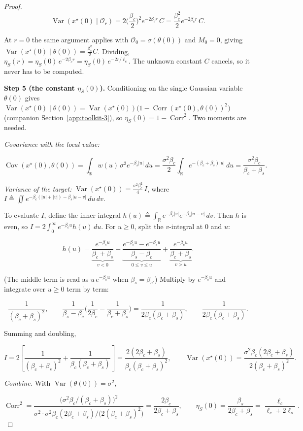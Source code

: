 \begin{proof}
\[
\operatorname{Var}(x^\star(0)\mid\mathcal O_r)=2\Big(\frac{\beta_c}{2}\Big)^2e^{-2\beta_c r}\,C=\frac{\beta_c^2}{2}e^{-2\beta_c r}\,C .
\]

At $r=0$ the same argument applies with $\mathcal O_0=\sigma(\theta(0))$ and $M_0=0$, giving $\operatorname{Var}(x^\star(0)\mid\theta(0))=\tfrac{\beta_c^2}{2}C$. Dividing, $\eta_S(r)=\eta_S(0)\,e^{-2\beta_c r}=\eta_S(0)\,e^{-2r/\ell_c}$. The unknown constant $C$ cancels, so it never has to be computed.

\textbf{Step 5 (the constant $\eta_S(0)$).} Conditioning on the single Gaussian variable $\theta(0)$ gives $\operatorname{Var}(x^\star(0)\mid\theta(0))=\operatorname{Var}(x^\star(0))\big(1-\operatorname{Corr}(x^\star(0),\theta(0))^2\big)$ (companion Section~\ref{app:toolkit-3}), so $\eta_S(0)=1-\operatorname{Corr}^2$. Two moments are needed.

\emph{Covariance with the local value:}

\[
\operatorname{Cov}(x^\star(0),\theta(0))=\int_{\mathbb R}w(u)\,\sigma^2e^{-\beta_s|u|}\,du=\frac{\sigma^2\beta_c}{2}\int_{\mathbb R}e^{-(\beta_c+\beta_s)|u|}\,du=\frac{\sigma^2\beta_c}{\beta_c+\beta_s}.
\]

\emph{Variance of the target:} $\operatorname{Var}(x^\star(0))=\frac{\sigma^2\beta_c^2}{4}\,I$, where $I\triangleq\iint e^{-\beta_c(|u|+|v|)-\beta_s|u-v|}\,du\,dv$.

To evaluate $I$, define the inner integral $h(u)\triangleq\int_{\mathbb R}e^{-\beta_c|v|}e^{-\beta_s|u-v|}\,dv$. Then $h$ is even, so $I=2\int_0^\infty e^{-\beta_c u}h(u)\,du$. For $u\ge0$, split the $v$-integral at $0$ and $u$:

\[
h(u)=\underbrace{\frac{e^{-\beta_s u}}{\beta_c+\beta_s}}_{v<0}+\underbrace{\frac{e^{-\beta_c u}-e^{-\beta_s u}}{\beta_s-\beta_c}}_{0\le v\le u}+\underbrace{\frac{e^{-\beta_c u}}{\beta_c+\beta_s}}_{v>u}.
\]

(The middle term is read as $u\,e^{-\beta_c u}$ when $\beta_s=\beta_c$.) Multiply by $e^{-\beta_c u}$ and integrate over $u\ge0$ term by term:

\[
\frac{1}{(\beta_c+\beta_s)^2},\qquad \frac{1}{\beta_s-\beta_c}\Big(\frac{1}{2\beta_c}-\frac{1}{\beta_c+\beta_s}\Big)=\frac{1}{2\beta_c(\beta_c+\beta_s)},\qquad \frac{1}{2\beta_c(\beta_c+\beta_s)} .
\]

Summing and doubling,

\begin{equation}
I=2\left[\frac{1}{(\beta_c+\beta_s)^2}+\frac{1}{\beta_c(\beta_c+\beta_s)}\right]=\frac{2(2\beta_c+\beta_s)}{\beta_c(\beta_c+\beta_s)^2},\qquad \operatorname{Var}(x^\star(0))=\frac{\sigma^2\beta_c(2\beta_c+\beta_s)}{2(\beta_c+\beta_s)^2}.
\end{equation}

\emph{Combine.} With $\operatorname{Var}(\theta(0))=\sigma^2$,

\[
\operatorname{Corr}^2=\frac{\big(\sigma^2\beta_c/(\beta_c+\beta_s)\big)^2}{\sigma^2\cdot\sigma^2\beta_c(2\beta_c+\beta_s)/\big(2(\beta_c+\beta_s)^2\big)}=\frac{2\beta_c}{2\beta_c+\beta_s},\qquad \eta_S(0)=\frac{\beta_s}{2\beta_c+\beta_s}=\frac{\ell_c}{\ell_c+2\ell_s}.
\]
\end{proof}

